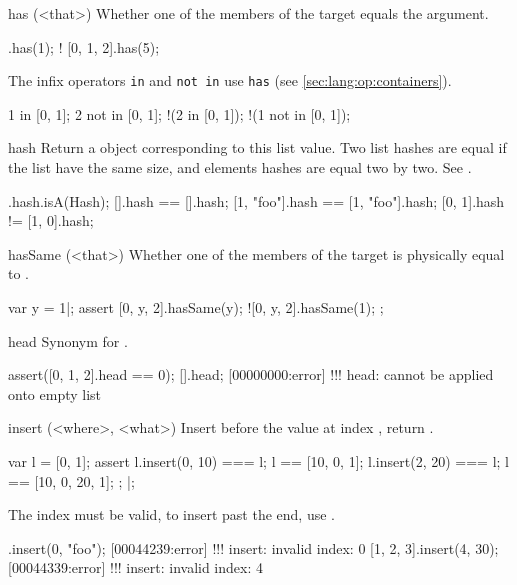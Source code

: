 \begin{urbiscriptapi}
\item[has](<that>)%
  Whether one of the members of the target equals the argument.

\begin{urbiassert}
[0, 1, 2].has(1);
! [0, 1, 2].has(5);
\end{urbiassert}

  The infix operators \lstinline|in| and \lstinline|not in| use
  \lstinline|has| (see \autoref{sec:lang:op:containers}).

\begin{urbiassert}
  1 in     [0, 1];
  2 not in [0, 1];
!(2 in     [0, 1]);
!(1 not in [0, 1]);
\end{urbiassert}

\item[hash] Return a  object corresponding to this list
  value. Two list hashes are equal if the list have the same size, and
  elements hashes are equal two by two. See .

\begin{urbiassert}
[].hash.isA(Hash);
[].hash == [].hash;
[1, "foo"].hash == [1, "foo"].hash;
[0, 1].hash != [1, 0].hash;
\end{urbiassert}

\item[hasSame](<that>)%
  Whether one of the members of the target is physically equal to
  .
\begin{urbiscript}
var y = 1|;
assert
{
   [0, y, 2].hasSame(y);
  ![0, y, 2].hasSame(1);
};
\end{urbiscript}

\item[head]
  Synonym for .
\begin{urbiscript}
assert([0, 1, 2].head == 0);
[].head;
[00000000:error] !!! head: cannot be applied onto empty list
\end{urbiscript}

\item[insert](<where>, <what>)%
  Insert  before the value at index , return
  \this.
\begin{urbiscript}
{
  var l = [0, 1];
  assert
  {
    l.insert(0, 10) === l;
    l == [10, 0, 1];
    l.insert(2, 20) === l;
    l == [10, 0, 20, 1];
  };
}|;
\end{urbiscript}

  The index must be valid, to insert past the end, use .
\begin{urbiscript}
[].insert(0, "foo");
[00044239:error] !!! insert: invalid index: 0
[1, 2, 3].insert(4, 30);
[00044339:error] !!! insert: invalid index: 4
\end{urbiscript}



\end{urbiscriptapi}
